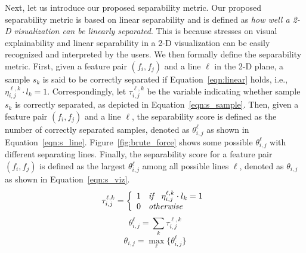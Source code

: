 Next, let us introduce our proposed separability metric. Our proposed separability metric is based on linear separability and is defined as {\em how well a 2-D visualization can be linearly separated}. This is because \genviz stresses on visual explainability and linear separability in a 2-D visualization can be easily recognized and interpreted by the users. We then formally define the separability metric.
First, given a feature pair $(f_i, f_j)$ and a line $\ell$ in the 2-D plane, a sample $s_k$ is said to be correctly separated if Equation~\ref{eqn:linear} holds, i.e., $\eta_{i,j}^{\ell,k}\cdot l_k = 1$. Correspondingly, let $\tau_{i,j}^{\ell,k}$ be the variable indicating whether sample $s_k$ is correctly separated, as depicted in Equation~\ref{eqn:s_sample}. Then, given a feature pair $(f_i, f_j)$ and a line $\ell$, the separability score is defined as the number of correctly separated samples, denoted as $\theta_{i, j}^\ell$ as shown in Equation~\ref{eqn:s_line}. Figure~\ref{fig:brute_force} shows some possible $\theta_{i, j}^\ell$ with different separating lines. Finally, the separability score for a feature pair $(f_i,f_j)$ is defined as the largest $\theta_{i, j}^{\ell}$ among all possible lines $\ell$, denoted as $\theta_{i, j}$ as shown in Equation~\ref{eqn:s_viz}. 
\begin{equation}\label{eqn:s_sample}
\tau_{i,j}^{\ell,k}=\left\{
                \begin{array}{ll}
                  1 \textit{\hspace{2mm} if \hspace{2mm}} \eta_{i,j}^{\ell,k}\cdot l_k = 1\\
                  0 \textit{\hspace{2mm} otherwise \hspace{2mm}} 
                \end{array}
              \right.
\end{equation}
\begin{equation}\label{eqn:s_line}
\theta_{i,j}^{\ell}= \sum_{k}{\tau_{i,j}^{\ell,k}}
\end{equation}
\begin{equation}\label{eqn:s_viz}
\theta_{i,j}= \max_{\ell}\{\theta_{i,j}^{\ell}\}
\end{equation}


